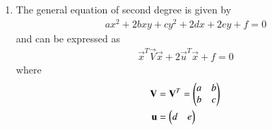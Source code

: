 \renewcommand{\theequation}{\theenumi}
\begin{enumerate}[label=\thesubsection.\arabic*.,ref=\thesubsection.\theenumi]
\item The general equation of second degree is given by
\begin{align}
ax^2+2bxy+cy^2+2dx+2ey+f=0
\end{align}
and can be expressed as
\begin{align}
\label{eq:conic_quad_form}
\vec{x}^T\vec{V}\vec{x}+2\vec{u}^T\vec{x}+f=0
\end{align}
%
where
\begin{align}
\vec{V} &= \vec{V}^T = \myvec{a & b \\ b & c}
\\
\vec{u} &= \myvec{d & e}
\end{align}


\end{enumerate}

